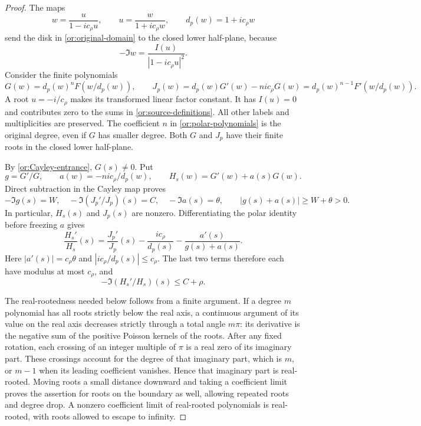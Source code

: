 \begin{proof}
The maps
\[
 w=\frac u{1-ic_\rho u},\qquad
 u=\frac w{1+ic_\rho w},\qquad d_p(w)=1+ic_\rho w
\]
send the disk in \eqref{or:original-domain} to the closed lower
half-plane, because
\[
       -\Im w=\frac{I(u)}{|1-ic_\rho u|^2}.
\]
Consider the finite polynomials
\begin{equation}\label{or:polar-polynomials}
 G(w)=d_p(w)^nF(w/d_p(w)),\qquad
 J_p(w)=d_p(w)G'(w)-nic_\rho G(w)
       =d_p(w)^{n-1}F'(w/d_p(w)).
\end{equation}
A root $u=-i/c_\rho$ makes its
transformed linear factor constant.  It has $I(u)=0$ and contributes
zero to the sums in \eqref{or:source-definitions}.  All other labels
and multiplicities are preserved.  The coefficient $n$ in
\eqref{or:polar-polynomials} is the original degree, even if $G$ has
smaller degree.  Both $G$ and $J_p$ have their finite roots in the
closed lower half-plane.

By \eqref{or:Cayley-entrance}, $G(s)\ne0$.  Put
\[
 g=G'/G,\qquad a(w)=-nic_\rho/d_p(w),\qquad
 H_s(w)=G'(w)+a(s)G(w).
\]
Direct subtraction in the Cayley map proves
\[
 -\Im g(s)=W,\quad -\Im(J_p'/J_p)(s)=C,\quad
 -\Im a(s)=\theta,
 \qquad |g(s)+a(s)|\ge W+\theta>0.
\]
In particular, $H_s(s)$ and $J_p(s)$ are nonzero.  Differentiating
the polar identity before freezing $a$ gives
\begin{equation}\label{or:frozen-polar}
 \frac{H_s'}{H_s}(s)
  =\frac{J_p'}{J_p}(s)-\frac{ic_\rho}{d_p(s)}
                      -\frac{a'(s)}{g(s)+a(s)}.
\end{equation}
Here $|a'(s)|=c_\rho\theta$ and $|ic_\rho/d_p(s)|\le c_\rho$.
The last two terms therefore each have modulus at most $c_\rho$,
and
\begin{equation}\label{or:frozen-upper}
                   -\Im(H_s'/H_s)(s)\le C+\rho.
\end{equation}

The real-rootedness needed below follows from a finite argument.
If a degree $m$ polynomial has all roots strictly below
the real axis, a continuous argument of its value on the real axis
decreases strictly through a total angle $m\pi$: its derivative is
the negative sum of the positive Poisson kernels of the roots.
After any fixed rotation, each crossing of an integer multiple of
$\pi$ is a real zero of its imaginary part.  These crossings account
for the degree of that imaginary part, which is $m$, or $m-1$ when
its leading coefficient vanishes.  Hence that imaginary part is
real-rooted.  Moving roots a small distance downward and taking a
coefficient limit proves the assertion for roots on the boundary as
well, allowing repeated roots and degree drop.  A nonzero coefficient
limit of real-rooted polynomials is real-rooted, with roots allowed to
escape to infinity.


\end{proof}

